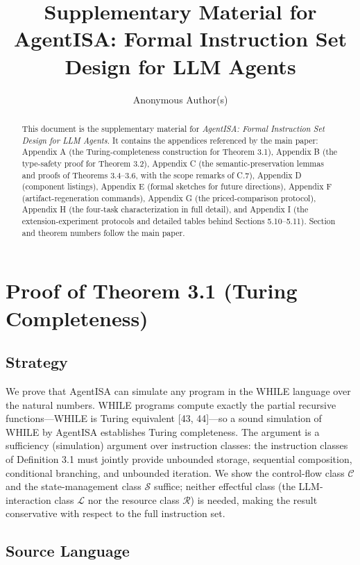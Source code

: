 \documentclass[
  11pt,
]{article}
\title{Supplementary Material for AgentISA: Formal Instruction Set
Design for LLM Agents}
\author{Anonymous Author(s)}
\date{}
\begin{document}
\maketitle
\begin{abstract}
This document is the supplementary material for \emph{AgentISA: Formal
Instruction Set Design for LLM Agents}. It contains the appendices
referenced by the main paper: Appendix A (the Turing-completeness
construction for Theorem 3.1), Appendix B (the type-safety proof for
Theorem 3.2), Appendix C (the semantic-preservation lemmas and proofs of
Theorems 3.4--3.6, with the scope remarks of C.7), Appendix D (component
listings), Appendix E (formal sketches for future directions), Appendix
F (artifact-regeneration commands), Appendix G (the priced-comparison
protocol), Appendix H (the four-task characterization in full detail),
and Appendix I (the extension-experiment protocols and detailed tables
behind Sections 5.10--5.11). Section and theorem numbers follow the main
paper.
\end{abstract}

\appendix

\section{Proof of Theorem 3.1 (Turing
Completeness)}\label{proof-of-theorem-3.1-turing-completeness}

\subsection{Strategy}\label{strategy}

We prove that AgentISA can simulate any program in the WHILE language
over the natural numbers. WHILE programs compute exactly the partial
recursive functions---WHILE is Turing equivalent {[}43, 44{]}---so a
sound simulation of WHILE by AgentISA establishes Turing completeness.
The argument is a sufficiency (simulation) argument over instruction
classes: the instruction classes of Definition 3.1 must jointly provide
unbounded storage, sequential composition, conditional branching, and
unbounded iteration. We show the control-flow class \(\mathcal{C}\) and
the state-management class \(\mathcal{S}\) suffice; neither effectful
class (the LLM-interaction class \(\mathcal{L}\) nor the resource class
\(\mathcal{R}\)) is needed, making the result conservative with respect
to the full instruction set.

\subsection{Source Language}\label{source-language}
\end{document}
